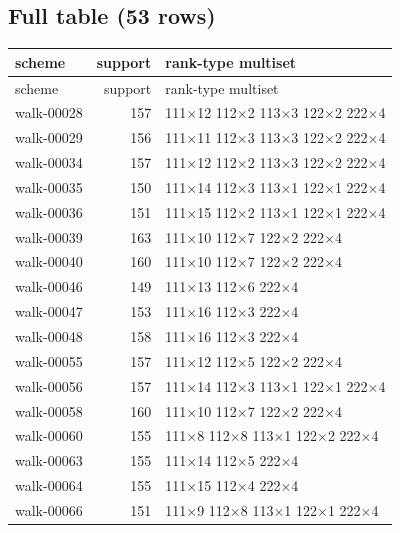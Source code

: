 \documentclass[10pt]{article}
\begin{document}
\subsection*{Full table (53 rows)}

{\small
\begin{longtable}{@{}l r l@{}}
\toprule
scheme & support & rank-type multiset \\
\midrule
\endfirsthead
\toprule
scheme & support & rank-type multiset \\
\midrule
\endhead
\bottomrule
\endlastfoot
walk-00028 & 157 & 111\(\times\)12 112\(\times\)2 113\(\times\)3 122\(\times\)2 222\(\times\)4 \\
walk-00029 & 156 & 111\(\times\)11 112\(\times\)3 113\(\times\)3 122\(\times\)2 222\(\times\)4 \\
walk-00034 & 157 & 111\(\times\)12 112\(\times\)2 113\(\times\)3 122\(\times\)2 222\(\times\)4 \\
walk-00035 & 150 & 111\(\times\)14 112\(\times\)3 113\(\times\)1 122\(\times\)1 222\(\times\)4 \\
walk-00036 & 151 & 111\(\times\)15 112\(\times\)2 113\(\times\)1 122\(\times\)1 222\(\times\)4 \\
walk-00039 & 163 & 111\(\times\)10 112\(\times\)7 122\(\times\)2 222\(\times\)4 \\
walk-00040 & 160 & 111\(\times\)10 112\(\times\)7 122\(\times\)2 222\(\times\)4 \\
walk-00046 & 149 & 111\(\times\)13 112\(\times\)6 222\(\times\)4 \\
walk-00047 & 153 & 111\(\times\)16 112\(\times\)3 222\(\times\)4 \\
walk-00048 & 158 & 111\(\times\)16 112\(\times\)3 222\(\times\)4 \\
walk-00055 & 157 & 111\(\times\)12 112\(\times\)5 122\(\times\)2 222\(\times\)4 \\
walk-00056 & 157 & 111\(\times\)14 112\(\times\)3 113\(\times\)1 122\(\times\)1 222\(\times\)4 \\
walk-00058 & 160 & 111\(\times\)10 112\(\times\)7 122\(\times\)2 222\(\times\)4 \\
walk-00060 & 155 & 111\(\times\)8 112\(\times\)8 113\(\times\)1 122\(\times\)2 222\(\times\)4 \\
walk-00063 & 155 & 111\(\times\)14 112\(\times\)5 222\(\times\)4 \\
walk-00064 & 155 & 111\(\times\)15 112\(\times\)4 222\(\times\)4 \\
walk-00066 & 151 & 111\(\times\)9 112\(\times\)8 113\(\times\)1 122\(\times\)1 222\(\times\)4 \\

\end{longtable}}
\end{document}
